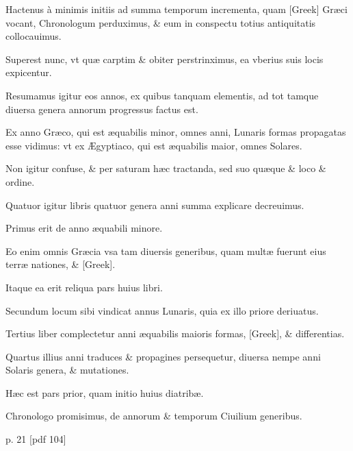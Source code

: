 \begin{parnumbers}
Hactenus à minimis initiis ad summa temporum
incrementa, quam \textgreek{[Greek]} Græci vocant, Chronologum
perduximus, \& eum in conspectu totius antiquitatis collocauimus.

Superest nunc, vt quæ carptim \& obiter perstrinximus, ea vberius
suis locis expicentur.

Resumamus igitur eos annos, ex quibus tanquam
elementis, ad tot tamque diuersa genera annorum progressus
factus est.

Ex anno Græco, qui est æquabilis minor, omnes anni, Lunaris
formas propagatas esse vidimus: vt ex Ægyptiaco, qui est æquabilis
maior, omnes Solares.

Non igitur confuse, \& per saturam hæc
tractanda, sed suo quæque \& loco \& ordine.

Quatuor igitur libris
quatuor genera anni summa explicare decreuimus.

Primus erit de
anno æquabili minore.

Eo enim omnis Græcia vsa tam diuersis generibus,
quam multæ fuerunt eius terræ nationes, \& \textgreek{[Greek]}.

Itaque
ea erit reliqua pars huius libri.

Secundum locum sibi vindicat annus
Lunaris, quia ex illo priore deriuatus.

Tertius liber complectetur anni
æquabilis maioris formas, \textgreek{[Greek]}, \& differentias.

Quartus illius anni
traduces \& propagines persequetur, diuersa nempe anni Solaris genera,
\& mutationes.

Hæc est pars prior, quam initio huius diatribæ.

Chronologo promisimus, de annorum \& temporum Ciuilium generibus.

\end{parnumbers}
\clearpage
p. 21 [pdf 104]
